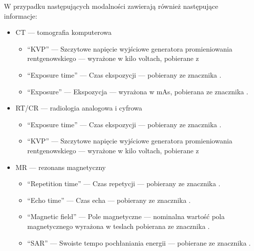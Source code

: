 W przypadku następujących modalności zawierają również następujące informacje:
\begin{itemize}
    \item CT --- tomografia komputerowa
          \begin{itemize}
              \item \enquote{KVP} --- Szczytowe napięcie wyjściowe generatora promieniowania rentgenowskiego --- wyrażone w kilo voltach, pobierane z 
              \item \enquote{Exposure time} --- Czas ekspozycji --- pobierany ze znacznika .
              \item \enquote{Exposure} --- Ekspozycja --- wyrażona w mAs, pobierana ze znacznika .
          \end{itemize}

    \item RT/CR --- radiologia analogowa i cyfrowa
          \begin{itemize}
              \item \enquote{Exposure time} --- Czas ekspozycji --- pobierany ze znacznika .
              \item \enquote{KVP} --- Szczytowe napięcie wyjściowe generatora promieniowania rentgenowskiego --- wyrażone w kilo voltach, pobierane z 
          \end{itemize}

    \item MR --- rezonans magnetyczny
          \begin{itemize}
              \item \enquote{Repetition time} --- Czas repetycji --- pobierany ze znacznika .
              \item \enquote{Echo time} --- Czas echa --- pobierany ze znacznika .
              \item \enquote{Magnetic field} --- Pole magnetyczne --- nominalna wartość pola magnetycznego wyrażona w teslach pobierana ze znacznika .
              \item \enquote{SAR} --- Swoiste tempo pochłaniania energii --- pobierane ze znacznika .
          \end{itemize}
\end{itemize}